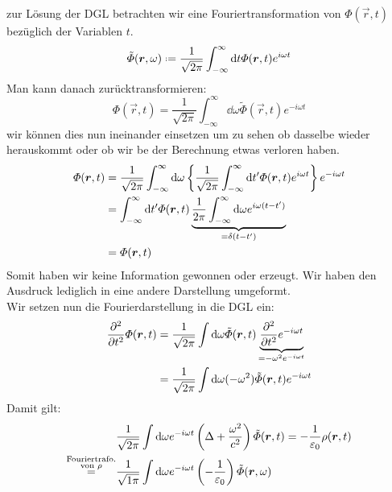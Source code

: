 zur Lösung der DGL betrachten wir eine Fouriertransformation von $ \Phi (\vec{r},t) $ bezüglich der Variablen $ t $.
\begin{equation*}
\tilde{\Phi}(\vec{r},\omega) \defeq \frac{1}{\sqrt{2 \pi}} \int_{- \infty}^{\infty} \dd t \Phi (\vec{r},t) e^{i \omega t}
\end{equation*}
Man kann danach zurücktransformieren:
\begin{equation*}
\Phi (\vec{r},t) = \frac{1}{\sqrt{2 \pi}} \int_{-\infty}^{\infty} \dd \omega \tilde{\Phi} (\vec{r},t) e^{- i \omega t}
\end{equation*}
wir können dies nun ineinander einsetzen um zu sehen ob dasselbe wieder herauskommt oder ob wir be der Berechnung etwas verloren haben.
\begin{align*}
\varPhi(\bm{r},t) &= \frac{1}{\sqrt{2 \pi}} \int_{- \infty}^{\infty} \textrm{d} \omega \left\{ \frac{1}{\sqrt{2 \pi}} \int_{- \infty}^{\infty} \textrm{d} t' \varPhi(\bm{r},t) e^{i \omega t}\right\} e^{- i \omega t} \\
&= \int_{- \infty}^{\infty} \textrm{d} t' \varPhi(\bm{r},t) \underbrace{\frac{1}{2 \pi} \int_{-\infty}^{\infty} \textrm{d} \omega e^{i \omega (t - t')}}_{= \delta(t - t')}\\
&= \varPhi (\bm{r},t)
\end{align*}
Somit haben wir keine Information gewonnen oder erzeugt. Wir haben den Ausdruck lediglich in eine andere Darstellung umgeformt.\\[5pt]
Wir setzen nun die Fourierdarstellung in die DGL ein:
\begin{align*}
\frac{\partial ^2}{\partial t^2} \varPhi(\bm{r},t) &= \frac{1}{\sqrt{2 \pi}} \int \textrm{d} \omega \tilde{\varPhi} (\bm{r},t) \underbrace{\frac{\partial ^2}{\partial t^2} e^{- i \omega t}}_{= - \omega^2 e^{- i \omega t}}\\
&= \frac{1}{\sqrt{2 \pi}} \int \textrm{d} \omega (- \omega ^2) \tilde{\varPhi} (\bm{r},t) e^{- i \omega t}
\end{align*}
Damit gilt:
\begin{align*}
& \frac{1}{\sqrt{2 \pi}} \int \textrm{d} \omega e^{- i \omega t} \left(\Delta + \frac{\omega^2}{c^2}\right) \tilde{\varPhi} (\bm{r},t) = - \frac{1}{\varepsilon_0} \rho (\bm{r},t)\\
\overset{\substack{\textrm{Fouriertrafo.} \\ \textrm{von } \rho}}{=} & \frac{1}{\sqrt{1 \pi}} \int \textrm{d} \omega e^{- i \omega t} \left(- \frac{1}{\varepsilon_0}\right) \tilde{\varPhi} (\bm{r},\omega)
\end{align*}

